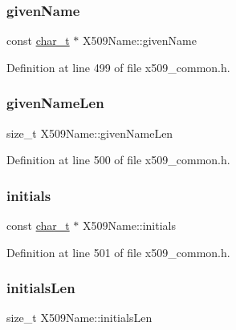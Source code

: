 \subsubsection{\texorpdfstring{given\+Name}{givenName}}
{\footnotesize\ttfamily const \hyperlink{compiler__port_8h_a40bb5262bf908c328fbcfbe5d29d0201}{char\+\_\+t} $\ast$ X509\+Name\+::given\+Name}



Definition at line 499 of file x509\+\_\+common.\+h.

\mbox{\label{structX509Name_aacfef579b78cdecc4e865d3a59dc5901}} 
\subsubsection{\texorpdfstring{given\+Name\+Len}{givenNameLen}}
{\footnotesize\ttfamily size\+\_\+t X509\+Name\+::given\+Name\+Len}



Definition at line 500 of file x509\+\_\+common.\+h.

\mbox{\label{structX509Name_a4b7ee284208fc072beb26bd1ab2d8297}} 
\subsubsection{\texorpdfstring{initials}{initials}}
{\footnotesize\ttfamily const \hyperlink{compiler__port_8h_a40bb5262bf908c328fbcfbe5d29d0201}{char\+\_\+t} $\ast$ X509\+Name\+::initials}



Definition at line 501 of file x509\+\_\+common.\+h.

\mbox{\label{structX509Name_a2b7b4d29b65c03212c5b2fb3d94c1ab1}} 
\subsubsection{\texorpdfstring{initials\+Len}{initialsLen}}
{\footnotesize\ttfamily size\+\_\+t X509\+Name\+::initials\+Len}



